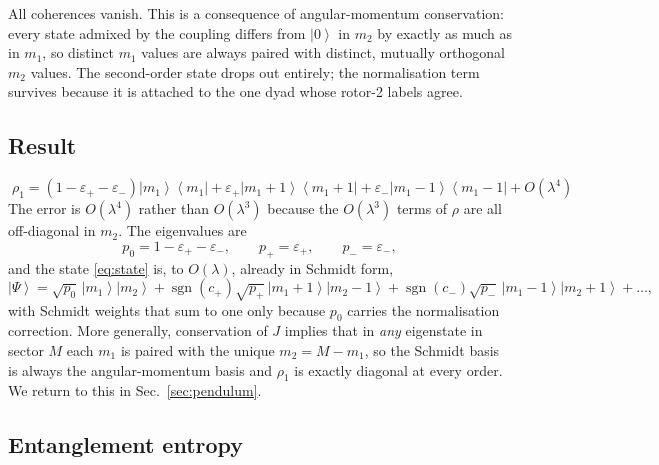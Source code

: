 \documentclass[preprint,12pt]{elsarticle}
\newcommand{\ket}[1]{\left|#1\right\rangle}
\newcommand{\ketbra}[2]{\left|#1\right\rangle\!\left\langle#2\right|}
\newcommand{\epsp}{\varepsilon_{+}}
\newcommand{\epsm}{\varepsilon_{-}}
\begin{document}
All coherences vanish. This is a consequence of angular-momentum conservation:
every state admixed by the coupling differs from $\ket0$ in $m_{2}$ by exactly
as much as in $m_{1}$, so distinct $m_{1}$ values are always paired with
distinct, mutually orthogonal $m_{2}$ values. The second-order state drops out
entirely; the normalisation term survives because it is attached to the one
dyad whose rotor-2 labels agree.

\subsection{Result}

\begin{equation}
\boxed{\;
\rho_{1}=\left(1-\epsp-\epsm\right)\ketbra{m_{1}}{m_{1}}
+\epsp\ketbra{m_{1}+1}{m_{1}+1}+\epsm\ketbra{m_{1}-1}{m_{1}-1}
+O(\lambda^{4})\;}
\label{eq:rho1}
\end{equation}
The error is $O(\lambda^{4})$ rather than $O(\lambda^{3})$ because the
$O(\lambda^{3})$ terms of $\rho$ are all off-diagonal in $m_{2}$. The
eigenvalues are
\begin{equation}
p_{0}=1-\epsp-\epsm,\qquad p_{+}=\epsp,\qquad p_{-}=\epsm,
\label{eq:eigs}
\end{equation}
and the state \eqref{eq:state} is, to $O(\lambda)$, already in Schmidt form,
\begin{equation}
\ket\Psi=\sqrt{p_{0}}\,\ket{m_{1}}\ket{m_{2}}
+\operatorname{sgn}(c_{+})\sqrt{p_{+}}\,\ket{m_{1}+1}\ket{m_{2}-1}
+\operatorname{sgn}(c_{-})\sqrt{p_{-}}\,\ket{m_{1}-1}\ket{m_{2}+1}+\dots,
\end{equation}
with Schmidt weights that sum to one only because $p_{0}$ carries the
normalisation correction. More generally, conservation of $J$ implies that in
\emph{any} eigenstate in sector $M$ each $m_{1}$ is paired with the unique
$m_{2}=M-m_{1}$, so the Schmidt basis is always the angular-momentum basis and
$\rho_{1}$ is exactly diagonal at every order. We return to this in
Sec.~\ref{sec:pendulum}.

\subsection{Entanglement entropy}
\end{document}
